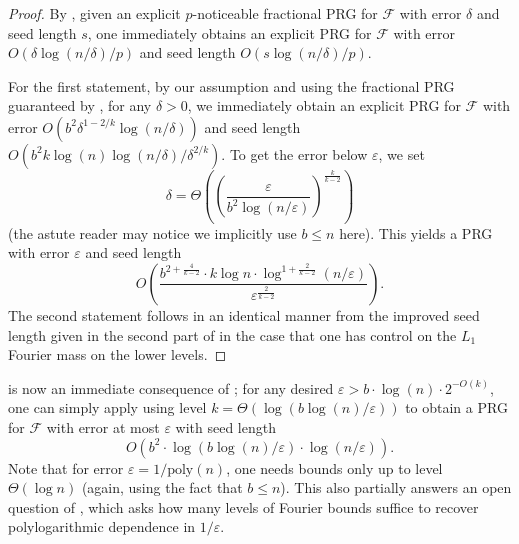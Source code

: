 \documentclass[10pt,a4paper]{article}
\newcommand{\eps}{\varepsilon}
\theoremstyle{definition}
\begin{document}
\begin{proof}
By  , given an explicit $p$-noticeable fractional PRG for $\mathcal{F}$ with error $\delta$ and seed length $s$, one immediately obtains an explicit PRG for $\mathcal{F}$ with error $O(\delta \log(n/\delta)/p)$ and seed length $O(s\log(n/\delta)/p)$. 

For the first statement, by our assumption and using the fractional PRG guaranteed by   , for any $\delta>0$, we immediately obtain an explicit PRG for $\mathcal{F}$ with error $O(b^2 \delta^{1-2/k}\log(n/\delta))$ and seed length $O(b^2 k\log(n)\log(n/\delta)/\delta^{2/k})$. To get the error below $\eps$, we set
\begin{equation*}
    \delta = \Theta\left(\left(\frac{\eps}{b^2 \log(n/\eps)}\right)^{\frac{k}{k-2}}\right)
\end{equation*}
(the astute reader may notice we implicitly use $b\leq n$ here). This yields a PRG with error $\eps$ and seed length
\begin{equation*}
    O\left(\frac{b^{2+\frac{4}{k-2}}\cdot k \log n \cdot \log^{1+\frac{2}{k-2}}(n/\eps)}{\eps^{\frac{2}{k-2}}}\right).
\end{equation*}
The second statement follows in an identical manner from the improved seed length given in the second part of  in the case that one has control on the $L_1$ Fourier mass on the lower levels.
\end{proof}
 is now an immediate consequence of ; for any desired $\eps > b\cdot \log(n)\cdot 2^{-O(k)}$, one can simply apply  using level $k = \Theta(\log(b\log(n)/\eps))$ to obtain a PRG for $\mathcal{F}$ with error at most $\eps$ with seed length 
\begin{equation*}
    O(b^2\cdot \log(b\log( n)/\eps)\cdot \log(n/\eps)).
\end{equation*}
Note that for error $\eps = 1/\mathrm{poly}(n)$, one needs bounds only up to level $\Theta(\log n)$ (again, using the fact that $b\leq n$). This also partially answers an open question of \cite{CHLT}, which asks how many levels of Fourier bounds suffice to recover polylogarithmic dependence in $1/\eps$.
\end{document}
